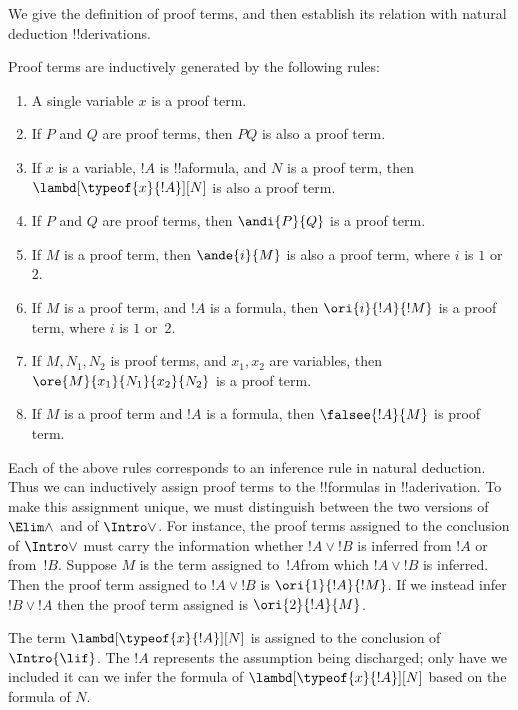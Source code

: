 \documentclass[../../../include/open-logic-section]{subfiles}
\begin{document}


We give the definition of proof terms, and then establish its relation
with natural deduction !!{derivation}s.

\begin{defn}
  Proof terms are inductively generated by the following rules:
  \begin{enumerate}
  \item A single variable $x$ is a proof term.
  \item If $P$ and $Q$ are proof terms, then $PQ$ is also a proof
    term.
  \item If $x$ is a variable, $!A$ is !!a{formula}, and $N$ is a proof
    term, then $\lambd[\typeof{x}{!A}][N]$ is also a proof term.
  \item If $P$ and $Q$ are proof terms, then $\andi{P}{Q}$ is a proof
    term.
  \item If $M$ is a proof term, then $\ande{i}{M}$ is also a proof
    term, where $i$ is $1$ or~$2$.
  \item If $M$ is a proof term, and $!A$ is a formula, then
    $\ori{i}{!A}{!M}$ is a proof term, where $i$ is $1$ or~$2$.
  \item If $M, N_1, N_2$ is proof terms, and $x_1, x_2$ are variables,
    then $\ore{M}{x_1}{N_1}{x_2}{N_2}$ is a proof term.
  \item If $M$ is a proof term and $!A$ is a formula, then
    $\falsee{!A}{M}$ is proof term.
  \end{enumerate}
\end{defn}

Each of the above rules corresponds to an inference rule in natural
deduction.  Thus we can inductively assign proof terms to the
!!{formula}s in !!a{derivation}.  To make this assignment unique, we
must distinguish between the two versions of $\Elim\land$ and of
$\Intro\lor$.  For instance, the proof terms assigned to the
conclusion of $\Intro\lor$ must carry the information whether $!A \lor
!B$ is inferred from $!A$ or from~$!B$. Suppose $M$ is the term
assigned to~$!A$from which $!A \lor !B$ is inferred. Then the proof
term assigned to $!A \lor !B$ is $\ori{1}{!A}{!M}$. If we instead
infer $!B \lor !A$ then the proof term assigned is $\ori{2}{!A}{M}$.

The term $\lambd[\typeof{x}{!A}][N]$ is assigned to the conclusion of
$\Intro{\lif}$. The $!A$ represents the assumption being discharged;
only have we included it can we infer the formula of
$\lambd[\typeof{x}{!A}][N]$ based on the formula of $N$.
\end{document}
